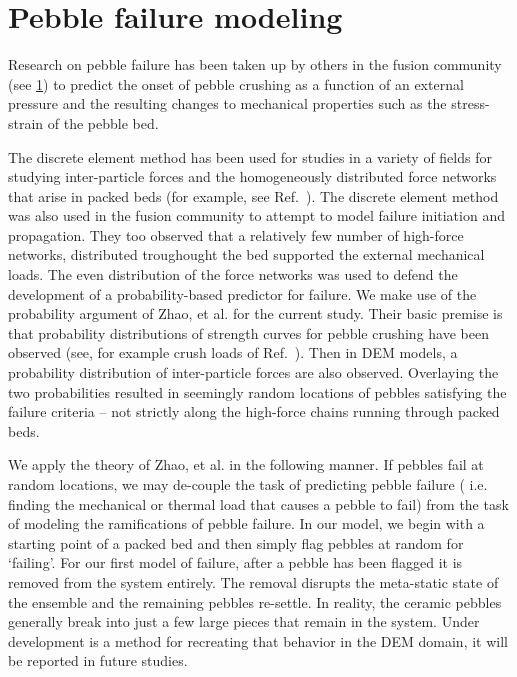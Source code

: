 
\section{Pebble failure modeling}
\label{sec:failure-discussion}
Research on pebble failure has been taken up by others in the fusion community (see \cref{sec:failure-discussion}) to predict the onset of pebble crushing as a function of an external pressure and the resulting changes to mechanical properties such as the stress-strain of the pebble bed. 



The discrete element method has been used for studies in a variety of fields for studying inter-particle forces and the homogeneously distributed force networks that arise in packed beds (for example, see Ref.~\cite{Makse2000}). The discrete element method was also used in the fusion community to attempt to model failure initiation and propagation\cite{Annabattula2012a, Zhao2012, Zhao2013}. They too observed that a relatively few number of high-force networks, distributed troughought the bed supported the external mechanical loads. The even distribution of the force networks was used to defend the development of a probability-based predictor for failure. We make use of the probability argument of Zhao, {et al.} for the current study\cite{Zhao2013}. Their basic premise is that probability distributions of strength curves for pebble crushing have been observed (see, for example crush loads of Ref.~\cite{Tsuchiya1998}). Then in DEM models, a probability distribution of inter-particle forces are also observed. Overlaying the two probabilities resulted in seemingly random locations of pebbles satisfying the failure criteria -- not strictly along the high-force chains running through packed beds.

We apply the theory of Zhao, { et al.} in the following manner. If pebbles fail at random locations, we may de-couple the task of predicting pebble failure ({ i.e.} finding the mechanical or thermal load that causes a pebble to fail) from the task of modeling the ramifications of pebble failure. In our model, we begin with a starting point of a packed bed and then simply flag pebbles at random for `failing'. For our first model of failure, after a pebble has been flagged it is removed from the system entirely. The removal disrupts the meta-static state of the ensemble and the remaining pebbles re-settle. In reality, the ceramic pebbles generally break into just a few large pieces that remain in the system. Under development is a method for recreating that behavior in the DEM domain, it will be reported in future studies.

